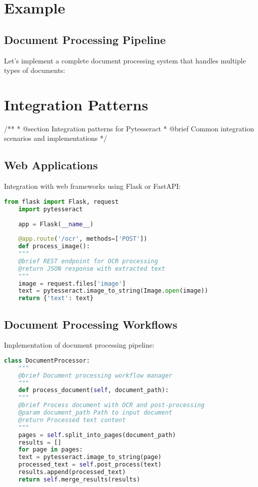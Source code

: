 \section{Example }
\subsection{Document Processing Pipeline}
Let's implement a complete document processing system that handles multiple types of documents:

%



\section{Integration Patterns}

/**
* @section Integration patterns for Pytesseract
* @brief Common integration scenarios and implementations
*/

\subsection{Web Applications}
Integration with web frameworks using Flask or FastAPI:

\begin{lstlisting}[language=Python]
	from flask import Flask, request
	import pytesseract
	
	app = Flask(__name__)
	
	@app.route('/ocr', methods=['POST'])
	def process_image():
	"""
	@brief REST endpoint for OCR processing
	@return JSON response with extracted text
	"""
	image = request.files['image']
	text = pytesseract.image_to_string(Image.open(image))
	return {'text': text}
\end{lstlisting}

\subsection{Document Processing Workflows}
Implementation of document processing pipeline:

\begin{lstlisting}[language=Python]
	class DocumentProcessor:
	"""
	@brief Document processing workflow manager
	"""
	def process_document(self, document_path):
	"""
	@brief Process document with OCR and post-processing
	@param document_path Path to input document
	@return Processed text content
	"""
	pages = self.split_into_pages(document_path)
	results = []
	for page in pages:
	text = pytesseract.image_to_string(page)
	processed_text = self.post_process(text)
	results.append(processed_text)
	return self.merge_results(results)
\end{lstlisting}

